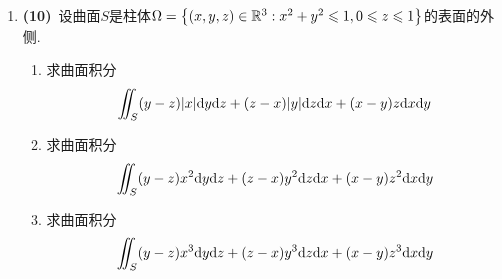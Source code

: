 \documentclass{ctexart}
\begin{document}
\begin{enumerate}[leftmargin=*,label=\textbf{\arabic*.}]
    \item \textbf{(10)}\ 设曲面$S$是柱体$\Omega=\left\{(x,y,z)\in\mathbb{R}^3:x^2+y^2\leqslant1,0\leqslant z\leqslant1\right\}$的表面的外侧.
        \begin{enumerate}[label=\tbf{(\arabic*)}]
            \item 求曲面积分
                \[\iint_S(y-z)|x|\mathrm{d} y\mathrm{d} z+(z-x)|y|\mathrm{d} z\mathrm{d} x+(x-y)z\mathrm{d} x\mathrm{d} y\]
            \item 求曲面积分
                \[\iint_S(y-z)x^2\mathrm{d} y\mathrm{d} z+(z-x)y^2\mathrm{d} z\mathrm{d} x+(x-y)z^2\mathrm{d} x\mathrm{d} y\]
            \item 求曲面积分
                \[\iint_S(y-z)x^3\mathrm{d} y\mathrm{d} z+(z-x)y^3\mathrm{d} z\mathrm{d} x+(x-y)z^3\mathrm{d} x\mathrm{d} y\]
        \end{enumerate}
\end{enumerate}
\end{document}
